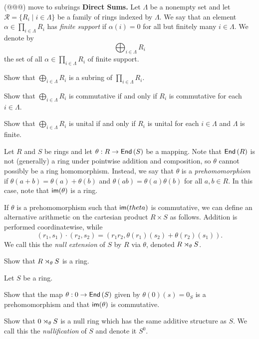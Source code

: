 \begin{exercise}
(@@@) move to subrings \textbf{Direct Sums.} Let \(\Lambda\) be a nonempty set and let \(\mathcal{R} = \{ R_i \mid i \in \Lambda \}\) be a family of rings indexed by \(\Lambda\). We say that an element \(\alpha \in \prod_{i \in \Lambda} R_i\) has \emph{finite support} if \(\alpha(i) = 0\) for all but finitely many \(i \in \Lambda\). We denote by \[ \bigoplus_{i \in \Lambda} R_i \] the set of all \(\alpha \in \prod_{i \in \Lambda} R_i\) of finite support.
\begin{proplist}
\item Show that \(\bigoplus_{i \in \Lambda} R_i\) is a subring of \(\prod_{i \in \Lambda} R_i\).
\item Show that \(\bigoplus_{i \in \Lambda} R_i\) is commutative if and only if \(R_i\) is commutative for each \(i \in \Lambda\).
\item Show that \(\bigoplus_{i \in \Lambda} R_i\) is unital if and only if \(R_i\) is unital for each \(i \in \Lambda\) and \(\Lambda\) is finite.
\end{proplist}
\end{exercise}


\begin{dfn} \label{dfn:null-extension}
Let \(R\) and \(S\) be rings and let \(\theta : R \rightarrow  \mathsf{End}\left(S\right) \) be a mapping.
Note that \( \mathsf{End}\left(R\right) \) is not (generally) a ring under pointwise addition and composition, so \(\theta\) cannot possibly be a ring homomorphism.
Instead, we say that \(\theta\) is a \emph{prehomomorphism} if \(\theta(a + b) = \theta(a) + \theta(b)\) and \(\theta(ab) = \theta(a)\theta(b)\) for all \(a,b \in R\).
In this case, note that \( \mathsf{im}(\theta) \) is a ring.

If \(\theta\) is a prehomomorphism such that \( \mathsf{im}(theta) \) is commutative, we can define an alternative arithmetic on the cartesian product \(R \times S\) as follows.
Addition is performed coordinatewise, while \[ (r_1, s_1) \cdot (r_2, s_2) = (r_1r_2, \theta(r_1)(s_2) + \theta(r_2)(s_1)). \]
We call this the \emph{null extension} of \(S\) by \(R\) via \(\theta\), denoted \(R \rtimes_{\theta} S\).
\end{dfn}


\begin{exercise}
Show that \(R \rtimes_{\theta} S\) is a ring.
\end{exercise}


\begin{exercise}
Let \(S\) be a ring.
\begin{proplist}
\item Show that the map \(\theta : 0 \rightarrow  \mathsf{End}\left(S\right) \) given by \(\theta(0)(s) = 0_S\) is a prehomomorphism and that \( \mathsf{im}(\theta) \) is commutative.
\item Show that \(0 \rtimes_{\theta} S\) is a null ring which has the same additive structure as \(S\).
We call this the \emph{nullification} of \(S\) and denote it \(S^0\).
\end{proplist}
\end{exercise}


